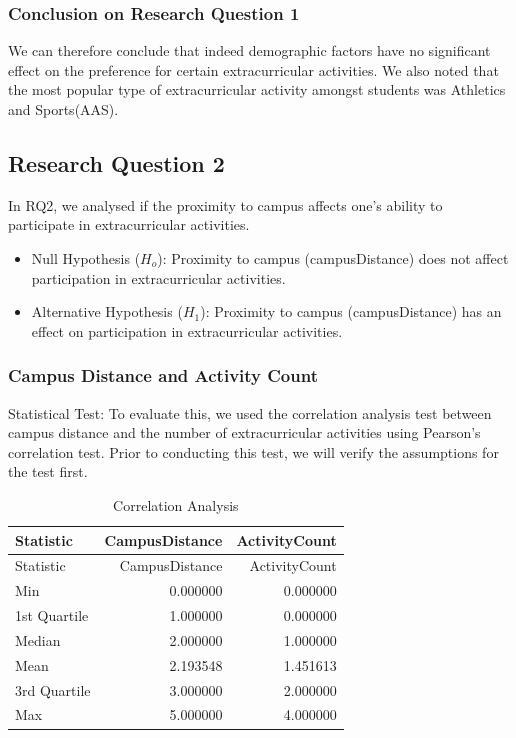 \documentclass[
  letterpaper,
  DIV=11,
  numbers=noendperiod]{scrartcl}
\providecommand{\tightlist}{%
  \setlength{\itemsep}{0pt}\setlength{\parskip}{0pt}}\usepackage{longtable,booktabs,array}
\begin{document}
\subsubsection{Conclusion on Research Question
1}\label{conclusion-on-research-question-1}

We can therefore conclude that indeed demographic factors have no
significant effect on the preference for certain extracurricular
activities. We also noted that the most popular type of extracurricular
activity amongst students was Athletics and Sports(AAS).

\subsection{Research Question 2}\label{research-question-2}

In RQ2, we analysed if the proximity to campus affects one's ability to
participate in extracurricular activities.

\begin{itemize}
\tightlist
\item
  Null Hypothesis (\(H_{o}\)): Proximity to campus (campusDistance) does
  not affect participation in extracurricular activities.
\item
  Alternative Hypothesis (\(H_{1}\)): Proximity to campus
  (campusDistance) has an effect on participation in extracurricular
  activities.
\end{itemize}

\subsubsection{Campus Distance and Activity
Count}\label{campus-distance-and-activity-count}

Statistical Test: To evaluate this, we used the correlation analysis
test between campus distance and the number of extracurricular
activities using Pearson's correlation test. Prior to conducting this
test, we will verify the assumptions for the test first.

\begin{longtable}[]{@{}lrr@{}}
\caption{Correlation Analysis}\tabularnewline
\toprule\noalign{}
Statistic & CampusDistance & ActivityCount \\
\midrule\noalign{}
\endfirsthead
\toprule\noalign{}
Statistic & CampusDistance & ActivityCount \\
\midrule\noalign{}
\endhead
\bottomrule\noalign{}
\endlastfoot
Min & 0.000000 & 0.000000 \\
1st Quartile & 1.000000 & 0.000000 \\
Median & 2.000000 & 1.000000 \\
Mean & 2.193548 & 1.451613 \\
3rd Quartile & 3.000000 & 2.000000 \\
Max & 5.000000 & 4.000000 \\
\end{longtable}
\end{document}
